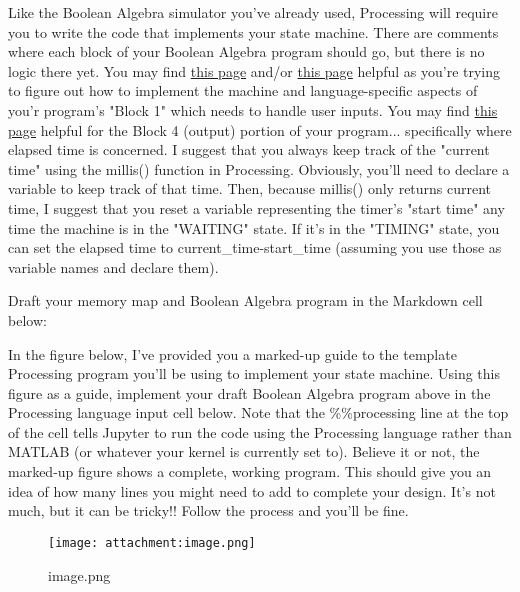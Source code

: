 \documentclass[11pt]{article}
\makeatletter
\def\maxwidth{\ifdim\Gin@nat@width>\linewidth\linewidth
    \else\Gin@nat@width\fi}
\let\Oldincludegraphics\includegraphics
\renewcommand{\includegraphics}[1]{\Oldincludegraphics[width=.8\maxwidth]{#1}}
\makeatother
\begin{document}
Like the Boolean Algebra simulator you've already used, Processing will
require you to write the code that implements your state machine. There
are comments where each block of your Boolean Algebra program should go,
but there is no logic there yet. You may find
\href{https://processing.org/reference/keyPressed.html}{this page}
and/or \href{https://processing.org/reference/key.html}{this page}
helpful as you're trying to figure out how to implement the machine and
language-specific aspects of you'r program's "Block 1" which needs to
handle user inputs. You may find
\href{https://processing.org/reference/millis_.html}{this page} helpful
for the Block 4 (output) portion of your program... specifically where
elapsed time is concerned. I suggest that you always keep track of the
"current time" using the millis() function in Processing. Obviously,
you'll need to declare a variable to keep track of that time. Then,
because millis() only returns current time, I suggest that you reset a
variable representing the timer's "start time" any time the machine is
in the "WAITING" state. If it's in the "TIMING" state, you can set the
elapsed time to current\_time-start\_time (assuming you use those as
variable names and declare them).

Draft your memory map and Boolean Algebra program in the Markdown cell
below:

    In the figure below, I've provided you a marked-up guide to the template
Processing program you'll be using to implement your state machine.
Using this figure as a guide, implement your draft Boolean Algebra
program above in the Processing language input cell below. Note that the
\%\%processing line at the top of the cell tells Jupyter to run the code
using the Processing language rather than MATLAB (or whatever your
kernel is currently set to). Believe it or not, the marked-up figure
shows a complete, working program. This should give you an idea of how
many lines you might need to add to complete your design. It's not much,
but it can be tricky!! Follow the process and you'll be fine.

    \begin{figure}
\centering
\texttt{[image: attachment:image.png]}
\caption{image.png}
\end{figure}
\end{document}
